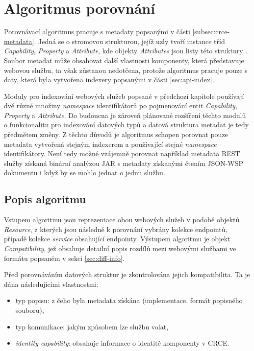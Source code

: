 \documentclass[czech,DP]{thesiskiv}
\begin{document}
\section{Algoritmus porovnání}
\label{sec:cmp-alg}

Porovnávací algoritmus pracuje s metadaty popsanými v části \ref{subsec:crce-metadata}. Jedná se o stromovou strukturou, jejíž uzly tvoří instance tříd \textit{Capability}, \textit{Property} a \textit{Attribute}, kde objekty \textit{Attributes} jsou listy této struktury . Soubor metadat může obsahovat další vlastnosti komponenty, která představuje webovou službu, ta však zůstanou nedotčena, protože algoritmus pracuje pouze s daty, která byla vytvořena indexery popsanými v části \ref{sec:api-index}.

Moduly pro indexování webových služeb popsané v předchozí kapitole používají dvě různé množiny \textit{namespace} identifikátorů po pojmenování entit \textit{Capability}, \textit{Property} a \textit{Attribute}. Do budoucna je zároveň plánované rozšíření těchto modulů o funkcionalitu pro indexování datových typů a datová struktura metadat je tedy předmětem změny. Z těchto důvodů je algoritmus schopen porovnat pouze metadata vytvořená stejným indexerem a používající stejné \textit{namespace} identifikátory. Není tedy možné vzájemně porovnat například metadata REST služby získaná binární analýzou JAR s metadaty získanými čtením JSON-WSP dokumentu i když by se mohlo jednat o jednu službu.

\subsection{Popis algoritmu}

Vstupem algoritmu jsou reprezentace obou webových služeb v podobě objektů \textit{Resource}, z kterých jsou následně k porovnání vybrány kolekce endpointů, případě kolekce \textit{service} obsahující endpointy. Výstupem algoritmu je objekt \textit{Compatibility}, jež obsahuje detailní popis rozdílů mezi webovými službami ve formátu popsaném v sekci \ref{sec:diff-info}.

Před porovnáváním datových struktur je zkontrolována jejich kompatibilita. Ta je dána následujícími vlastnostmi:

\begin{itemize}
	\item typ popisu: z čeho byla metadata získána (implementace, formát popisného souboru),
	\item typ komunikace: jakým způsobem lze službu volat,
	\item \textit{identity capability}: obsahuje informace o identitě komponenty v CRCE.
\end{itemize}
\end{document}
